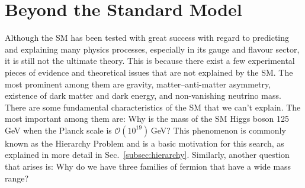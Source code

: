 \section{Beyond the Standard Model}\label{sec:bsm}
Although the SM has been tested with great success with regard to predicting and explaining many physics processes, especially in its gauge and flavour sector, it is still not the ultimate theory. This is because there exist a few experimental pieces of evidence and theoretical issues that are not explained by the SM. The most prominent among them are gravity, matter–anti-matter asymmetry, existence of dark matter and dark energy, and non-vanishing neutrino mass. There are some fundamental characteristics of the SM that we can't explain. The most important among them are: Why is the mass of the SM Higgs boson 125\,GeV when the Planck scale is $\mathcal{O}(10^{19})$\,GeV? This phenomenon is commonly known as the Hierarchy Problem and is a basic motivation for this search, as explained in more detail in Sec.~\ref{subsec:hierarchy}. Similarly, another question that arises is: Why do we have three families of fermion that have a wide mass range?
